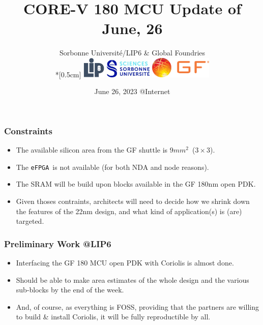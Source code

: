 \documentclass[10pt,aspectratio=169,presentation]{beamer}
\title{CORE-V 180 MCU Update of June, 26}
\author[J.-P. \Chaput]{Sorbonne Université/LIP6 \& Global Foundries \\*[0.5cm]
                          \includegraphics[height=1.0cm]{./images/Logo-LIP6-bleugris}\hspace{0.5cm}
                          \includegraphics[height=0.9cm]{./images/Logo-SU}           \hspace{0.5cm}
                          \includegraphics[height=1.0cm]{./images/GFonly-ORANGE-letters}%
                         }
\institute[SU-LIP6]{ \texttt{Jean-Paul.Chaput@lip6.fr} }
\date[June 26, 2023]{June 26, 2023 @Internet}
\newcommand {\NDA}           {\textsc{NDA}\xspace}
\begin{document}
   \titlepage


   \begin{frame}
     \frametitle{Constraints}
     \vspace*{\baselineskip}
     \begin{itemize}
       \setlength\itemsep{1.0\baselineskip}
       \item The available silicon area from the GF shuttle is $9mm^2$\ ($3 \times 3$).
       \item The \texttt{eFPGA}\ is not available (for both \NDA and node reasons).
       \item The SRAM will be build upon blocks available in the GF 180nm open PDK.
       \item Given thoses contraints, architects will need to decide how we shrink
             down the features of the 22nm design, and what kind of application(s)
             is (are) targeted.
     \end{itemize}
   \end{frame}


   \begin{frame}
     \frametitle{Preliminary Work @LIP6}
     \begin{itemize}
       \setlength\itemsep{1.0\baselineskip}
       \item Interfacing the GF 180 MCU open PDK with Coriolis is almost done.
       \item Should be able to make area estimates of the whole design and
             the various sub-blocks by the end of the week.
       \item And, of course, as everything is FOSS, providing that the partners
             are willing to build \& install Coriolis, it will be fully reproductible
             by all.
     \end{itemize}
   \end{frame}


 
\end{document}
